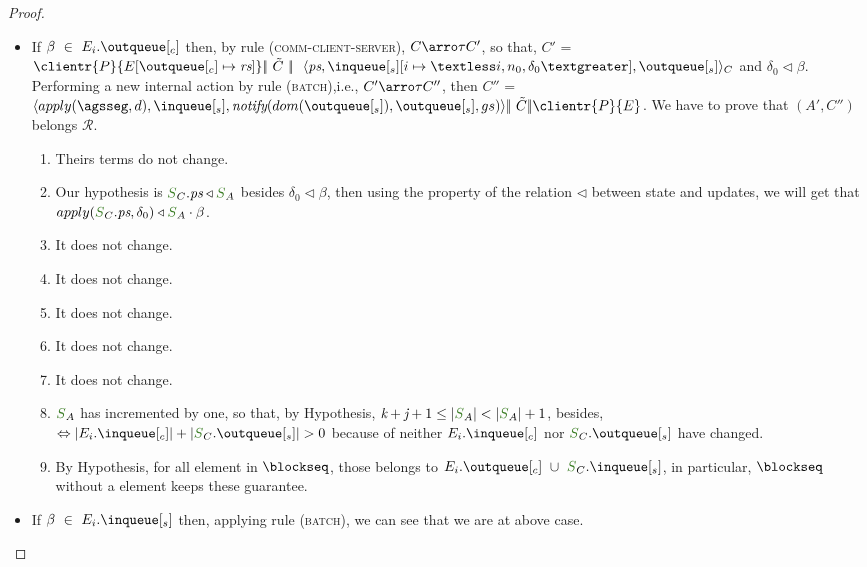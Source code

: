\documentclass[envcountsect,runningheads,orivec]{llncs}
\begin{document}
\begin{proof}
\begin{itemize}
\begin{itemize}
					
					
					\begin{itemize}
						\item If $\beta \ \in\ E_{i}.\outclient$ then, by rule (\textsc{\footnotesize{comm-client-server}}), $C \arroi{\tau} C'$, so that, $C'$ = $\clientr{P}{\update{E}{\outclient}{\tailround}} \bigpar\ \tilde{C} \ \bigpar\ \ \server{\state}{\update{\inserver}{i}{\headerround}}{\outserver}_C$ and $\delta_0 \triangleleft \beta$. Performing a new internal action by rule (\textsc{\footnotesize{batch}}),i.e., $C' \arroi{\tau} C''$, then $C''$ = $\server{\apply{\persistedstate}{d}}{\inserver}{\notify{dom(\outserver)}{\outserver}{gs}}  \bigpar\ \tilde{C} \bigpar \clientr{P}{\stateclient}$. We have to prove that $(A',C'')$ belongs $\mathcal{R}$.
						
						\begin{enumerate}
							\item Theirs terms do not change.
							\item Our hypothesis is $\queuemessage_C.\state \triangleleft \queuemessage_A$ besides $\delta_0 \triangleleft \beta$, then using the property of the relation $\triangleleft$ between state and updates, we will get that $apply(\queuemessage_C.\state,\delta_0) \triangleleft \queuemessage_A \cdot \beta$.
							\item It does not change.
							\item It does not change.
							\item It does not change.
							\item It does not change.
							\item It does not change.
							\item $\queuemessage_A$  has incremented by one, so that, by Hypothesis, $\tknown + \treceivebuffer + 1 \leq |\queuemessage_A| < |\queuemessage_A| + 1$, besides, $\Leftrightarrow |E_{i}.\inclient| + |\queuemessage_C.\outserver| > 0$ because of neither $E_{i}.\inclient$ nor $\queuemessage_C.\outserver$ have changed.
\item By Hypothesis, for all element in $\tsent$, those belongs to $E_{i}.\outclient \ \cup \ \queuemessage_C.\inserver$, in particular, $\tsent$ without a element keeps these guarantee.
						\end{enumerate}
\item If $\beta \ \in\ E_{i}.\inserver$ then, applying rule (\textsc{\footnotesize{batch}}), we can see that we are at above case.
					\end{itemize}
					

\end{itemize}
\end{itemize}
\end{proof}
\end{document}
